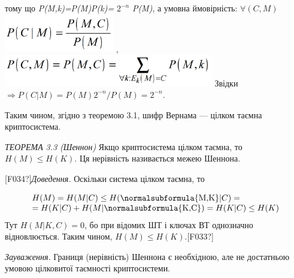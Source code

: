 {\centering
тому що
\textit{P}\textit{(}\textit{M}\textit{,}\textit{k}\textit{)=}\textit{P}\textit{(}\textit{M}\textit{)}\textit{P}\textit{(}\textit{k}\textit{)=}
$2^{-n}$ \textit{P}\textit{(}\textit{M}\textit{)},  а  умовна ймовірність: 
$\forall (C,M)$  
\includegraphics[width=1.8862in,height=0.661in]{crypt-img/crypt-img36.png} ,  
\includegraphics[width=3.602in,height=0.539in]{crypt-img/crypt-img37.png} 
Звідки  $\Rightarrow P(C|M)=P(M)2^{-n}/P(M)=2^{-n}$. 
\par}

Таким чином, згідно з теоремою 3.1, шифр Вернама --- цілком таємна криптосистема.


\bigskip

\textit{ТЕОРЕМА }\textit{3}\textit{.3 (Шеннон)} Якщо криптосистема цілком
таємна, то  $H(M)\le H(K)$. Ця нерівність називається межею Шеннона.

\textlatin{[F034?]}\textit{Доведення.} Оскільки система цілком таємна, то 

\begin{equation*}
\begin{matrix}{H(M)=H(M|C)\le H(\normalsubformula{\text{M,K}}|C)=}\hfill\null
\\{=H(K|C)+H(M|\normalsubformula{\text{K,C}})=H(K|C)\le H({K})}\hfill\null
\end{matrix}\hfill 
\end{equation*}
Тут   $H(M|K,C)=0$, бо при відомих ШТ і  ключах ВТ однозначно відновлюється. 
Таким чином,   $H(M)\le H(K)$.\textlatin{[F033?]}

\textit{Зауваження.} Границя (нерівність) Шеннона є необхідною, але не
достатньою умовою цілковитої таємності криптосистеми.

